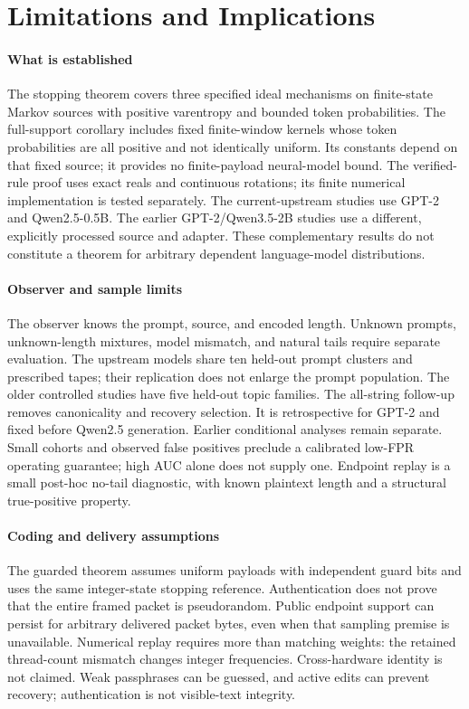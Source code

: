 \section{Limitations and Implications}

\paragraph{What is established}
The stopping theorem covers three specified ideal mechanisms on finite-state
Markov sources with positive varentropy and bounded token probabilities. The
full-support corollary includes fixed finite-window kernels whose token
probabilities are all positive and not identically uniform. Its constants
depend on that fixed source; it provides no finite-payload neural-model bound.
The
verified-rule proof uses exact reals and continuous rotations; its finite
numerical implementation is tested separately. The current-upstream studies
use GPT-2 and Qwen2.5-0.5B. The earlier GPT-2/Qwen3.5-2B studies use a different,
explicitly processed source and adapter. These complementary results do not constitute a theorem
for arbitrary dependent language-model distributions.

\paragraph{Observer and sample limits}
The observer knows the prompt, source, and encoded length. Unknown prompts,
unknown-length mixtures, model mismatch, and natural tails require separate
evaluation. The upstream models share ten held-out prompt clusters and prescribed
tapes; their replication does not enlarge the prompt population. The older
controlled studies have five held-out topic families. The all-string follow-up
removes canonicality and recovery selection. It is retrospective for GPT-2
and fixed before Qwen2.5 generation. Earlier conditional analyses remain separate. Small cohorts
and observed false positives preclude a calibrated low-FPR operating guarantee;
high AUC alone does not supply one. Endpoint replay is a small post-hoc no-tail diagnostic,
with known plaintext length and a structural true-positive property.

\paragraph{Coding and delivery assumptions}
The guarded theorem assumes uniform payloads with independent guard bits and
uses the same integer-state stopping reference. Authentication does not prove
that the entire framed packet is pseudorandom. Public endpoint support can
persist for arbitrary delivered packet bytes, even when that sampling premise
is unavailable. Numerical replay requires more than matching weights: the
retained thread-count mismatch changes integer frequencies. Cross-hardware
identity is not claimed. Weak passphrases can be guessed, and active edits
can prevent recovery; authentication is not visible-text integrity.

